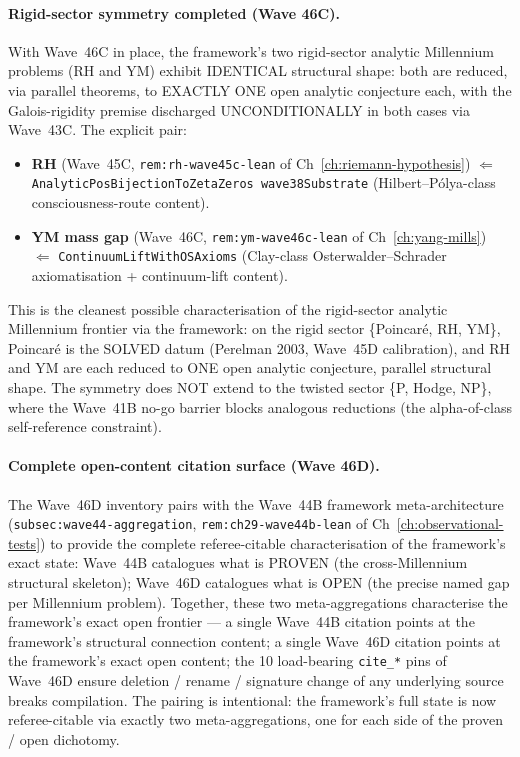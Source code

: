 \paragraph{Rigid-sector symmetry completed (Wave 46C).}
With Wave~46C in place, the framework's two rigid-sector analytic
Millennium problems (RH and YM) exhibit IDENTICAL structural
shape: both are reduced, via parallel theorems, to EXACTLY ONE
open analytic conjecture each, with the Galois-rigidity premise
discharged UNCONDITIONALLY in both cases via Wave~43C. The
explicit pair:
\begin{itemize}
\item \textbf{RH} (Wave~45C, \texttt{rem:rh-wave45c-lean} of
  Ch~\ref{ch:riemann-hypothesis}) $\Leftarrow$
  \texttt{AnalyticPosBijectionToZetaZeros wave38Substrate}
  (Hilbert--P\'olya-class consciousness-route content).
\item \textbf{YM mass gap} (Wave~46C,
  \texttt{rem:ym-wave46c-lean} of Ch~\ref{ch:yang-mills})
  $\Leftarrow$ \texttt{ContinuumLiftWithOSAxioms} (Clay-class
  Osterwalder--Schrader axiomatisation + continuum-lift content).
\end{itemize}
This is the cleanest possible characterisation of the rigid-sector
analytic Millennium frontier via the framework: on the rigid
sector \{Poincar\'e, RH, YM\}, Poincar\'e is the SOLVED datum
(Perelman 2003, Wave~45D calibration), and RH and YM are each
reduced to ONE open analytic conjecture, parallel structural
shape. The symmetry does NOT extend to the twisted sector \{P,
Hodge, NP\}, where the Wave~41B no-go barrier blocks analogous
reductions (the alpha-of-class self-reference constraint).

\paragraph{Complete open-content citation surface (Wave 46D).}
The Wave~46D inventory pairs with the Wave~44B framework
meta-architecture (\texttt{subsec:wave44-aggregation},
\texttt{rem:ch29-wave44b-lean} of
Ch~\ref{ch:observational-tests}) to provide the complete
referee-citable characterisation of the framework's exact state:
Wave~44B catalogues what is PROVEN (the cross-Millennium
structural skeleton); Wave~46D catalogues what is OPEN (the
precise named gap per Millennium problem). Together, these two
meta-aggregations characterise the framework's exact open
frontier --- a single Wave~44B citation points at the framework's
structural connection content; a single Wave~46D citation points
at the framework's exact open content; the 10 load-bearing
\texttt{cite\_*} pins of Wave~46D ensure deletion / rename /
signature change of any underlying source breaks compilation.
The pairing is intentional: the framework's full state is now
referee-citable via exactly two meta-aggregations, one for each
side of the proven / open dichotomy.

